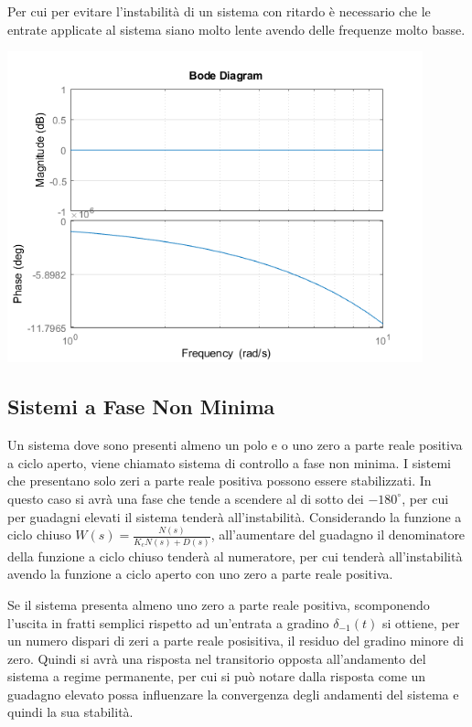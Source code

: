 \documentclass{article}
\numberwithin{equation}{subsection}
\begin{document}
Per cui per evitare l'instabilità di un sistema con ritardo è necessario che le entrate applicate al sistema siano molto lente avendo delle 
frequenze molto basse. 



\begin{center}
    \includegraphics[width=12cm]{Bode2.png}
\end{center}

\subsection{Sistemi a Fase Non Minima}

Un sistema dove sono presenti almeno un polo e o uno zero a parte reale positiva a ciclo aperto, viene chiamato sistema di controllo a fase non minima. I sistemi che presentano 
solo zeri a parte reale positiva possono essere stabilizzati. In questo caso si avrà una fase che tende a scendere al di sotto dei $-180^{\circ}$, per cui per guadagni elevati 
il sistema tenderà all'instabilità. Considerando la funzione a ciclo chiuso $W(s)=\displaystyle\frac{N(s)}{K_cN(s)+D(s)}$, all'aumentare del guadagno il denominatore 
della funzione a ciclo chiuso tenderà al numeratore, per cui tenderà all'instabilità avendo la funzione a ciclo aperto con uno zero a parte reale positiva. 


Se il sistema presenta almeno uno zero a parte reale positiva, scomponendo l'uscita in fratti semplici rispetto ad un'entrata a gradino $\delta_{-1}(t)$ si ottiene, per un 
numero dispari di zeri a parte reale posisitiva, il residuo del gradino minore di zero. Quindi si avrà una risposta nel transitorio opposta all'andamento del sistema a regime 
permanente, per cui si può notare dalla risposta come un guadagno elevato possa influenzare la convergenza degli andamenti del sistema e quindi la sua stabilità. 
\end{document}
